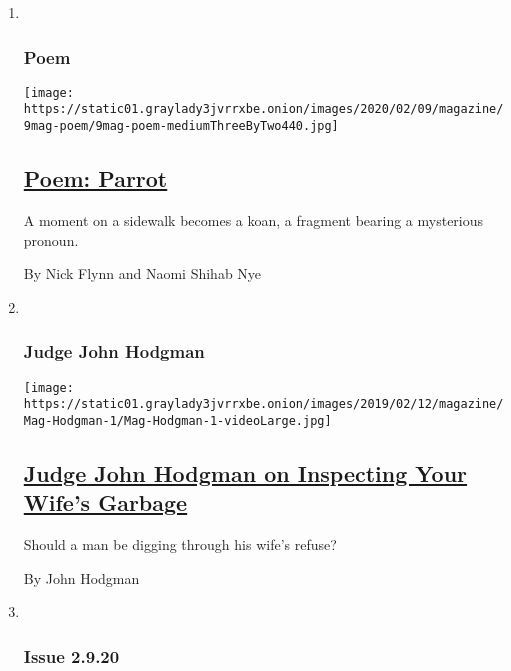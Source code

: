 \begin{enumerate}
\def\labelenumi{\arabic{enumi}.}
\item ~
  \hypertarget{poem}{%
  \subsubsection{Poem}\label{poem}}

  \texttt{[image: https://static01.graylady3jvrrxbe.onion/images/2020/02/09/magazine/9mag-poem/9mag-poem-mediumThreeByTwo440.jpg]}

  \hypertarget{poem-parrot}{%
  \subsection{\texorpdfstring{\href{/2020/02/06/magazine/poem-parrot.html}{Poem:
  Parrot}}{Poem: Parrot}}\label{poem-parrot}}

  A moment on a sidewalk becomes a koan, a fragment bearing a mysterious
  pronoun.

  By Nick Flynn and Naomi Shihab Nye
\item ~
  \hypertarget{judge-john-hodgman}{%
  \subsubsection{Judge John Hodgman}\label{judge-john-hodgman}}

  \texttt{[image: https://static01.graylady3jvrrxbe.onion/images/2019/02/12/magazine/Mag-Hodgman-1/Mag-Hodgman-1-videoLarge.jpg]}

  \hypertarget{judge-john-hodgman-on-inspecting-your-wifes-garbage}{%
  \subsection{\texorpdfstring{\href{/2020/02/06/magazine/judge-john-hodgman-on-inspecting-your-wifes-garbage.html}{Judge
  John Hodgman on Inspecting Your Wife's
  Garbage}}{Judge John Hodgman on Inspecting Your Wife's Garbage}}\label{judge-john-hodgman-on-inspecting-your-wifes-garbage}}

  Should a man be digging through his wife's refuse?

  By John Hodgman
\item ~
  \hypertarget{issue-2920}{%
  \subsubsection{Issue 2.9.20}\label{issue-2920}}


\end{enumerate}
